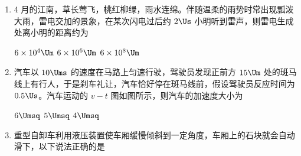 \documentclass[\gkver]{gaokaozhenti}
\begin{document}
\begin{enumerate}

{玻璃筒充满空气时，金属片和小羽毛均做自由落体运动}
{玻璃筒抽出空气后，金属片和小羽毛下落一样快}
{玻璃筒抽出空气后，金属片比小羽毛下落快}


\item
4 月的江南，草长莺飞，桃红柳绿，雨水连绵。伴随温柔的雨势时常出现瓢泼大雨，雷电交加的景象，在某次闪电过后约 $2\Us$ 小明听到雷声，则雷电生成处离小明的距离约为

{$6\times10^{4}\Um$}
{$6\times10^{6}\Um$}
{$6\times10^{8}\Um$}


\item
汽车以 $10\Ums$ 的速度在马路上匀速行驶，驾驶员发现正前方 $15\Um$ 处的斑马线上有行人，于是刹车礼让，汽车恰好停在斑马线前，假设驾驶员反应时间为 $0.5\Us$。汽车运动的 $v-t$ 图如图所示，则汽车的加速度大小为

\onepicture[w=4.65cm]{}

\fourchoices[answer=C]
{$20\Umsq$}
{$6\Umsq$}
{$5\Umsq$}
{$4\Umsq$}


\item
重型自卸车利用液压装置使车厢缓慢倾斜到一定角度，车厢上的石块就会自动滑下，以下说法正确的是


\end{enumerate}
\end{document}
